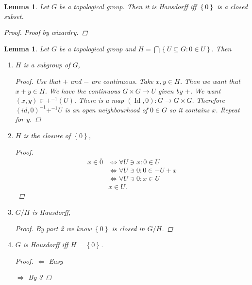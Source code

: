 \documentclass{article}
\DeclareMathOperator{\Id}{Id}
\newcommand{\set}[1]{\left\{#1\right\}}
\newcommand{\setwith}[2]{\left\{#1:#2\right\}}
\newtheorem{lemma}[theorem]{Lemma}
\theoremstyle{definition}
\begin{document}
\begin{lemma}
    Let \(G\) be a topological group. Then it is Hausdorff iff
    \(\set{0}\) is a closed subset.

    \begin{proof}
        Proof by wizardry.
    \end{proof}
\end{lemma}

\begin{lemma}
    Let \(G\) be a topological group and \(H=\bigcap\setwith{U\subseteq G}{0\in
        U}\). Then
    \begin{enumerate}
        \item \(H\) is a subgroup of \(G\),

              \begin{proof}
                  Use that \(+\) and \(-\) are continuous. Take \(x,y\in H\). Then we want
                  that \(x+y\in H\). We have the continuous \(G\times G\to U\) given by \(+\).
                  We want \((x,y)\in+^{-1}(U)\). There is a map
                  \((\Id,0):G\to G\times G\). Therefore \((id,0)^{-1}+^{-1}U\)
                  is an open neighbourhood of \(0\in G\) so it contains \(x\).
                  Repeat for \(y\).
              \end{proof}

        \item \(H\) is the closure of \(\set{0}\),

              \begin{proof}
                  \begin{align*}
                      x\in\overline{0} & \Leftrightarrow\forall U\ni x: 0\in U    \\
                                       & \Leftrightarrow\forall U\ni 0: 0\in -U+x \\
                                       & \Leftrightarrow\forall U\ni 0: x\in U    \\
                                       & x\in U.
                  \end{align*}
              \end{proof}

        \item \(G/H\) is Hausdorff,

              \begin{proof}
                  By part 2 we know \(\set{0}\) is closed in \(G/H\).
              \end{proof}

        \item \(G\) is Hausdorff iff \(H=\set{0}\).

              \begin{proof}
                  \(\Leftarrow\) Easy

                  \(\Rightarrow\) By 3
              \end{proof}
    \end{enumerate}
\end{lemma}
\end{document}
